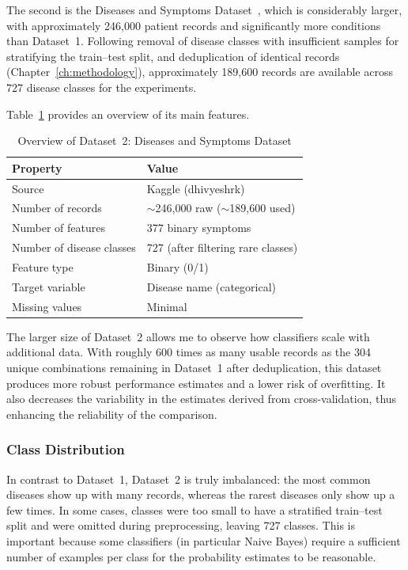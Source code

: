The second is the Diseases and Symptoms Dataset~\citep{Kaggle_Diseases2023}, which is considerably larger, with approximately 246,000 patient records and significantly more conditions than Dataset~1. Following removal of disease classes with insufficient samples for stratifying the train--test split, and deduplication of identical records (Chapter~\ref{ch:methodology}), approximately 189,600 records are available across 727 disease classes for the experiments.

Table~\ref{tab:dataset2_overview} provides an overview of its main features.

\begin{table}[H]
\centering
\caption{Overview of Dataset~2: Diseases and Symptoms Dataset}
\label{tab:dataset2_overview}
\begin{tabular}{@{}ll@{}}
\toprule
\textbf{Property}         & \textbf{Value} \\
\midrule
Source                     & Kaggle (dhivyeshrk) \\
Number of records          & $\sim$246,000 raw ($\sim$189,600 used) \\
Number of features         & 377 binary symptoms \\
Number of disease classes  & 727 (after filtering rare classes) \\
Feature type               & Binary (0/1) \\
Target variable            & Disease name (categorical) \\
Missing values             & Minimal \\
\bottomrule
\end{tabular}
\end{table}

The larger size of Dataset~2 allows me to observe how classifiers scale with additional data. With roughly 600 times as many usable records as the 304 unique combinations remaining in Dataset~1 after deduplication, this dataset produces more robust performance estimates and a lower risk of overfitting. It also decreases the variability in the estimates derived from cross-validation, thus enhancing the reliability of the comparison.

\subsubsection{Class Distribution}

In contrast to Dataset~1, Dataset~2 is truly imbalanced: the most common diseases show up with many records, whereas the rarest diseases only show up a few times. In some cases, classes were too small to have a stratified train--test split and were omitted during preprocessing, leaving 727 classes. This is important because some classifiers (in particular Naive Bayes) require a sufficient number of examples per class for the probability estimates to be reasonable.


